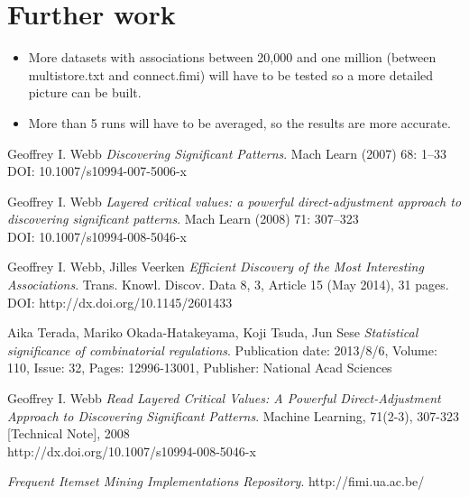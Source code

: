 \documentclass[10pt,a4paper]{article}
\begin{document}
\section{Further work}
\begin{itemize}
	\item More datasets with associations between 20,000 and one million (between multistore.txt and connect.fimi) will have to be tested so a more detailed picture can be built.
	
	\item More than 5 runs will have to be averaged, so the results are more accurate.
	
\end{itemize}



\pagebreak
\begin{thebibliography}{9}

Geoffrey I. Webb
\textit{Discovering Significant Patterns}. 
Mach Learn (2007) 68: 1–33\\
DOI: 10.1007/s10994-007-5006-x

Geoffrey I. Webb
\textit{Layered critical values: a powerful direct-adjustment
approach to discovering significant patterns}. 
Mach Learn (2008) 71: 307–323\\
DOI: 10.1007/s10994-008-5046-x

Geoffrey I. Webb, Jilles Veerken
\textit{Efficient Discovery of the Most Interesting Associations}. 
Trans. Knowl. Discov. Data 8, 3, Article 15 (May 2014), 31 pages.\\
DOI: http://dx.doi.org/10.1145/2601433

Aika Terada, Mariko Okada-Hatakeyama, Koji Tsuda, Jun Sese 
\textit{Statistical significance of combinatorial regulations}. 
Publication date: 2013/8/6, Volume: 110, Issue: 32, Pages: 12996-13001, Publisher: National Acad Sciences

Geoffrey I. Webb
\textit{Read Layered Critical Values: A Powerful Direct-Adjustment Approach to Discovering Significant Patterns}. 
Machine Learning, 71(2-3), 307-323 [Technical Note], 2008\\
http://dx.doi.org/10.1007/s10994-008-5046-x


\textit{Frequent Itemset Mining Implementations Repository}. 
http://fimi.ua.ac.be/


\end{thebibliography}
\end{document}
